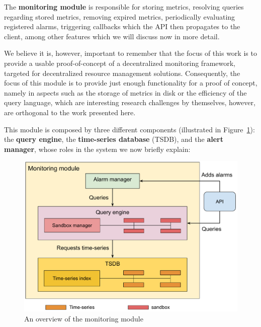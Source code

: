 

The \textbf{monitoring module} is responsible for storing metrics, resolving queries regarding stored metrics, removing expired metrics, periodically evaluating registered alarms, triggering callbacks which the API then propagates to the client, among other features which we will discuss now in more detail.

We believe it is, however, important to remember that the focus of this work is to provide a usable proof-of-concept of a decentralized monitoring framework, targeted for decentralized resource management solutions. Consequently, the focus of this module is to provide just enough functionality for a proof of concept, namely in aspects such as the storage of metrics in disk or the efficiency of the query language, which are interesting research challenges by themselves, however, are orthogonal to the work presented here. 

This module is composed by three different components (illustrated in Figure~\ref{fig:mon_module_overview}): the \textbf{query engine}, the \textbf{time-series database} (TSDB), and the \textbf{alert manager}, whose roles in the system we now briefly explain:

\begin{figure}[htbp]
    \centering
    \includegraphics[width=\textwidth]{Chapters/mon_module/images/Monitoring_module.pdf}
    \caption{An overview of the monitoring module}
    \label{fig:mon_module_overview}
\end{figure}

